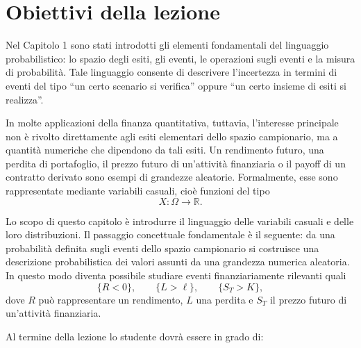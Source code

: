 \section{Obiettivi della lezione}

\label{sec:cap2-obiettivi}

Nel Capitolo 1 sono stati introdotti gli elementi fondamentali del linguaggio
probabilistico: lo spazio degli esiti, gli eventi, le operazioni sugli eventi
e la misura di probabilit\`{a}. Tale linguaggio consente di descrivere
l'incertezza in termini di eventi del tipo ``un certo scenario si verifica''
oppure ``un certo insieme di esiti si realizza''.

In molte applicazioni della finanza quantitativa, tuttavia, l'interesse
principale non \`{e} rivolto direttamente agli esiti elementari dello spazio
campionario, ma a quantit\`{a} numeriche che dipendono da tali esiti. Un
rendimento futuro, una perdita di portafoglio, il prezzo futuro di
un'attivit\`{a} finanziaria o il payoff di un contratto derivato sono esempi
di grandezze aleatorie. Formalmente, esse sono rappresentate mediante
variabili casuali, cio\`{e} funzioni del tipo
\[
X:\Omega\longrightarrow\mathbb{R}.
\]


Lo scopo di questo capitolo \`{e} introdurre il linguaggio delle variabili
casuali e delle loro distribuzioni. Il passaggio concettuale fondamentale
\`{e} il seguente: da una probabilit\`{a} definita sugli eventi dello spazio
campionario si costruisce una descrizione probabilistica dei valori assunti da
una grandezza numerica aleatoria. In questo modo diventa possibile studiare
eventi finanziariamente rilevanti quali
\[
\{R<0\},\qquad\{L>\ell\},\qquad\{S_{T}>K\},
\]
dove $R$ pu\`{o} rappresentare un rendimento, $L$ una perdita e $S_{T}$ il
prezzo futuro di un'attivit\`{a} finanziaria.

Al termine della lezione lo studente dovr\`{a} essere in grado di:

